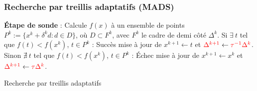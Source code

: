 \documentclass{beamer}
\newcommand\tab[1][1cm]{\hspace*{#1}}
\newcommand{\MADS}{\textsf{MADS}}
\begin{document}
\begin{frame}
\frametitle{Recherche par treillis adaptatifs (\MADS)}
\begin{algorithm}[H]
\begin{algorithmic}[]
\STATE \textbf{Étape de sonde} : Calcule $f(x)$ à un ensemble de points 
\STATE $P^k:=\{x^k+\delta ^k d:d\in D\}$, où {\color{red}$D\subset F^k$,
\STATE avec $F^k$ le cadre de demi côté $\Delta^k$.}
\STATE
\STATE Si $\exists~t$ tel que $f(t) < f(x^k)$, $t\in P^k$ : Succès
\STATE \tab mise à jour de $x^{k+1}\leftarrow t$ et ${\color{red}\Delta^{k+1}} \leftarrow {\color{red}\tau^{-1}\Delta^k}$.
\STATE
\STATE Sinon $\nexists~t$ tel que $f(t) < f(x^k)$, $t\in P^k$ : Échec
\STATE \tab mise à jour de $x^{k+1}\leftarrow x^k$ et ${\color{red}\Delta^{k+1}} \leftarrow {\color{red}\tau\Delta^k}$.
\ENDFOR
\end{algorithmic}
\caption{Recherche par treillis adaptatifs}
\label{alg:mads}
\end{algorithm}
\end{frame}
\end{document}
